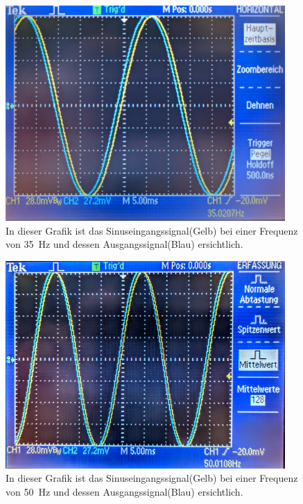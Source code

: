 \documentclass[12pt,english,ngerman]{scrartcl}
\begin{document}
\begin{figure}[H]
  \centering
    \includegraphics[width=0.95\textwidth]{./figures/integrator/35hz.jpg}
    \caption{In dieser Grafik ist das Sinuseingangssignal(Gelb) bei einer Frequenz von
    \SI{35}{\Hz} und dessen Ausgangssignal(Blau) ersichtlich.}
  \label{fig:mess_integrator_35hz}
\end{figure}

\begin{figure}[H]
  \centering
   \includegraphics[width=0.95\textwidth]{./figures/integrator/50hz.jpg}
    \caption{In dieser Grafik ist das Sinuseingangssignal(Gelb) bei einer Frequenz von
    \SI{50}{\Hz} und dessen Ausgangssignal(Blau) ersichtlich.}
  \label{fig:mess_integrator_50hz}
\end{figure}
\end{document}
